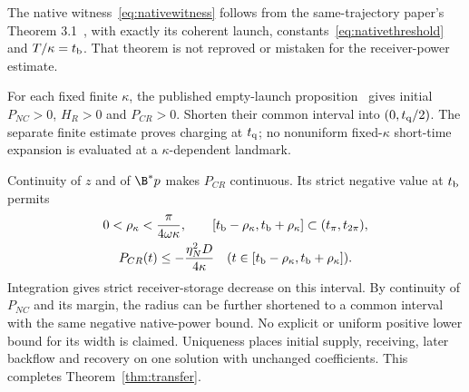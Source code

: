 The native witness~\eqref{eq:nativewitness} follows from the same-trajectory paper's Theorem 3.1~\cite{p2}, with exactly its coherent launch, constants~\eqref{eq:nativethreshold} and $T/\kappa=t_{\rm b}$. That theorem is not reproved or mistaken for the receiver-power estimate.

For each fixed finite $\kappa$, the published empty-launch proposition~\cite[Proposition 4.1]{p1} gives initial $P_{NC}>0$, $H_R>0$ and $P_{CR}>0$. Shorten their common interval into $(0,t_{\rm q}/2)$. The separate finite estimate proves charging at $t_{\rm q}$; no nonuniform fixed-$\kappa$ short-time expansion is evaluated at a $\kappa$-dependent landmark.

Continuity of $z$ and of $\B^*p$ makes $P_{CR}$ continuous. Its strict negative value at $t_{\rm b}$ permits
\begin{equation}\label{eq:backflowinterval}%
\begin{gathered}
0<\rho_\kappa<\frac{\pi}{4\omega\kappa},\qquad
[t_{\rm b}-\rho_\kappa,t_{\rm b}+\rho_\kappa]\subset(t_\pi,t_{2\pi}),\\
P_{CR}(t)\le-\frac{\eta_N^2D}{4\kappa}
\quad(t\in[t_{\rm b}-\rho_\kappa,t_{\rm b}+\rho_\kappa]).
\end{gathered}
\end{equation}
Integration gives strict receiver-storage decrease on this interval. By continuity of $P_{NC}$ and its margin, the radius can be further shortened to a common interval with the same negative native-power bound. No explicit or uniform positive lower bound for its width is claimed. Uniqueness places initial supply, receiving, later backflow and recovery on one solution with unchanged coefficients. This completes Theorem~\ref{thm:transfer}.
